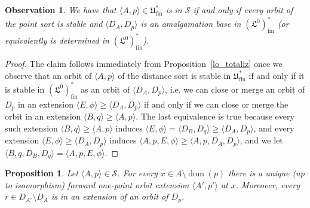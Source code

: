 \documentclass[10pt,a4paper]{amsart}
\newtheorem{prop}{Proposition}
\newtheorem{observation}{Observation}
\newcommand \Lin {\mathfrak{L}}
\newcommand \Su {\mathscr{S}}
\newcommand \Ult {\mathfrak{U}}
\newcommand \dom {\operatorname{dom}}
\newcommand \fin {{\operatorname{fin}}}
\newcommand \seq [1]{\langle #1 \rangle}
\begin{document}
\begin{observation} \label{distance_sort_stable}
    We have that $\seq{A, p} \in \Ult^*_\fin$ is in $\Su$ if and only if every orbit of the point sort is stable and $\seq{D_A, D_p}$ is an amalgamation base in $(\Lin^0)^*_\fin$ (or equivalently is determined in $(\Lin^0)^*_\fin$).
\end{observation}
\begin{proof}
    The claim follows immediately from Proposition~\ref{lo_totaliz} once we observe that an orbit of $\seq{A, p}$ of the distance sort is stable in $\Ult^*_\fin$ if and only if it is stable in $(\Lin^0)^*_\fin$ as an orbit of $\seq{D_A, D_p}$, i.e. we can close or merge an orbit of $D_p$ in an extension $\seq{E, \phi} \geq \seq{D_A, D_p}$ if and only if we can close or merge the orbit in an extension $\seq{B, q} \geq \seq{A, p}$.
    The last equivalence is true because every such extension $\seq{B, q} \geq \seq{A, p}$ induces $\seq{E, \phi} = \seq{D_B, D_q} \geq \seq{D_A, D_p}$, and every extension $\seq{E, \phi} \geq \seq{D_A, D_p}$ induces $\seq{A, p, E, \phi} \geq \seq{A, p, D_A, D_p}$, and we let $\seq{B, q, D_B, D_q} = \seq{A, p, E, \phi}$.
\end{proof}

\begin{prop} \label{thm:unique_onepoint_extension}
    Let $\seq{A, p} \in \Su$.
    For every $x \in A \setminus \dom(p)$ there is a unique (up to isomorphism) forward one-point orbit extension $\seq{A', p'}$ at $x$.
    Moreover, every $r \in D_{A'} \setminus D_A$ is in an extension of an orbit of $D_p$.
\end{prop}
\end{document}
